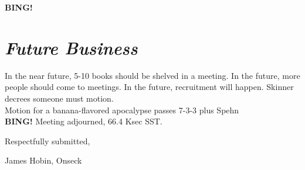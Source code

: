 \documentclass[10pt]{article}
\newcommand{\bing}{{\bf BING!} }
\newcommand{\goto}[1]{\bing \vskip 12pt \section*{{\em{#1}}}}
\newcommand{\ps}{ plus Spehn\xspace}
\newcommand{\onseck}{James Hobin, Onseck}
\begin{document}
\goto{Future Business}
In the near future, 5-10 books should be shelved in a meeting. In the future,
more people should come to meetings. In the future, recruitment will happen.
Skinner decrees someone must motion. \\
Motion for a banana-flavored apocalypse passes 7-3-3 \ps \\
\bing
\noindent
Meeting adjourned, 66.4 Ksec SST.

\vspace{18pt}

\centerline{Respectfully submitted,}
\centerline{\onseck}
\end{document}
